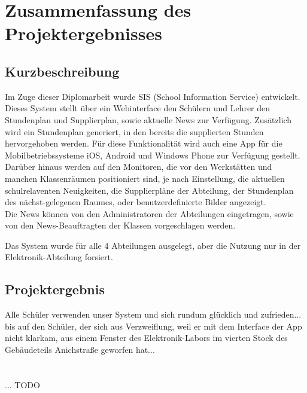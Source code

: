 \chapter[Zusammenfassung]{Zusammenfassung des Projektergebnisses}

\section{Kurzbeschreibung}
Im Zuge dieser Diplomarbeit wurde SIS (School Information Service) entwickelt. \\
Dieses System stellt über ein Webinterface den Schülern und Lehrer den Stundenplan und Supplierplan, sowie aktuelle News zur Verfügung. Zusätzlich wird ein Stundenplan generiert, in den bereits die supplierten Stunden hervorgehoben werden.
Für diese Funktionalität wird auch eine App für die Mobilbetriebssysteme iOS, Android und Windows Phone zur Verfügung gestellt.
Darüber hinaus werden auf den Monitoren, die vor den Werkstätten und manchen Klassenräumen positioniert sind, je nach Einstellung, die aktuellen schulrelaventen Neuigkeiten, die Supplierpläne der Abteilung, der Stundenplan des nächst-gelegenen Raumes, oder benutzerdefinierte Bilder angezeigt.\\
Die News können von den Administratoren der Abteilungen eingetragen, sowie von den News-Beauftragten der Klassen vorgeschlagen werden.


Das System wurde für alle 4 Abteilungen ausgelegt, aber die Nutzung nur in der Elektronik-Abteilung forsiert.

\section{Projektergebnis}
Alle Schüler verwenden unser System und sich rundum glücklich und zufrieden... bis auf den Schüler, der sich aus Verzweiflung, weil er mit dem Interface der App nicht klarkam, aus einem Fenster des Elektronik-Labors im vierten Stock des Gebäudeteils Anichstraße geworfen hat...\\
\\
\\... TODO